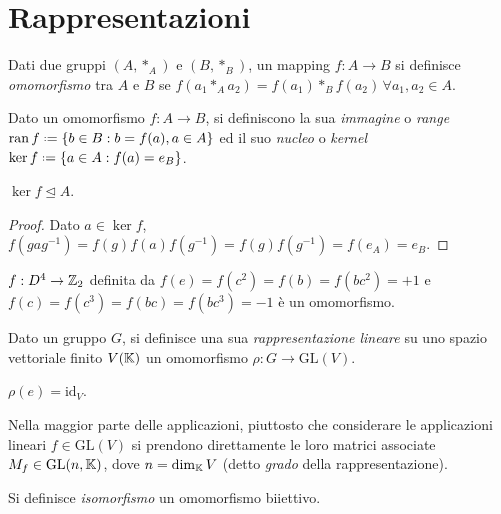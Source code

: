 
\section{Rappresentazioni}

\begin{definition}
	Dati due gruppi $ (A,*_A) $ e $ (B,*_B) $, un mapping $ f : A \rightarrow B $ si definisce \textit{omomorfismo} tra $ A $ e $ B $ se $ f(a_1 *_A a_2) = f(a_1) *_B f(a_2) \,\forall a_1,a_2 \in A $.
\end{definition}

\begin{definition}
	Dato un omomorfismo $ f : A \rightarrow B $, si definiscono la sua \textit{immagine} o \textit{range} $ \ran f \defeq \{b \in B : b = f(a), a \in A\} $ ed il suo \textit{nucleo} o \textit{kernel} $ \ker f \defeq \{a \in A : f(a) = e_B\} $.
\end{definition}

\begin{proposition}
	$ \ker f \trianglelefteq A $.
\end{proposition}
\begin{proof}
	Dato $ a \in \ker f $, $ f(gag^{-1}) = f(g) f(a) f(g^{-1}) = f(g) f(g^{-1}) = f(e_A) = e_B $.
\end{proof}

\begin{example}
	$ f : D^4 \rightarrow \mathbb{Z}_2 $ definita da $ f(e) = f(c^2) = f(b) = f(bc^2) = +1 $ e $ f(c) = f(c^3) = f(bc) = f(bc^3) = -1 $ è un omomorfismo.
\end{example}

\begin{definition}
	Dato un gruppo $ G $, si definisce una sua \textit{rappresentazione lineare} su uno spazio vettoriale finito $ V(\mathbb{K}) $ un omomorfismo $ \rho : G \rightarrow \mathrm{GL}(V) $.
\end{definition}

\begin{proposition}
	$ \rho(e) = \mathrm{id}_V $.
\end{proposition}

Nella maggior parte delle applicazioni, piuttosto che considerare le applicazioni lineari $ f \in \mathrm{GL}(V) $ si prendono direttamente le loro matrici associate $ M_f \in \mathrm{GL}(n,\mathbb{K}) $, dove $ n = \dim_{\mathbb{K}}{V} $ (detto \textit{grado} della rappresentazione).

\begin{definition}
	Si definisce \textit{isomorfismo} un omomorfismo biiettivo.
\end{definition}

